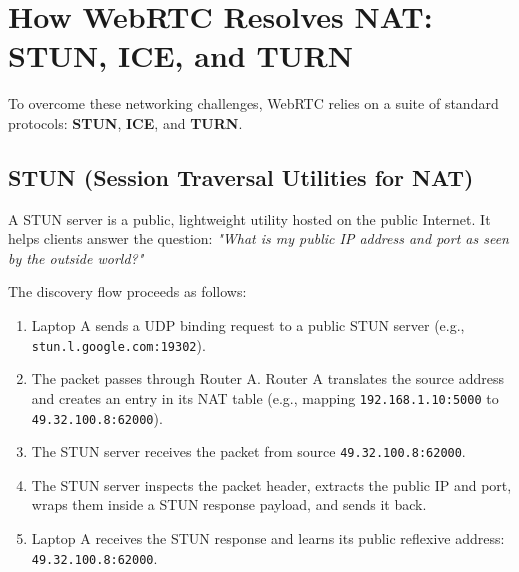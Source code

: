 \documentclass[11pt,a4paper]{article}
\begin{document}
\newpage

\section{How WebRTC Resolves NAT: STUN, ICE, and TURN}

To overcome these networking challenges, WebRTC relies on a suite of standard protocols: \textbf{STUN}, \textbf{ICE}, and \textbf{TURN}.

\subsection{STUN (Session Traversal Utilities for NAT)}
A STUN server is a public, lightweight utility hosted on the public Internet. It helps clients answer the question: \textit{"What is my public IP address and port as seen by the outside world?"}

The discovery flow proceeds as follows:
\begin{enumerate}
    \item Laptop A sends a UDP binding request to a public STUN server (e.g., \texttt{stun.l.google.com:19302}).
    \item The packet passes through Router A. Router A translates the source address and creates an entry in its NAT table (e.g., mapping \texttt{192.168.1.10:5000} to \texttt{49.32.100.8:62000}).
    \item The STUN server receives the packet from source \texttt{49.32.100.8:62000}.
    \item The STUN server inspects the packet header, extracts the public IP and port, wraps them inside a STUN response payload, and sends it back.
    \item Laptop A receives the STUN response and learns its public reflexive address: \texttt{49.32.100.8:62000}.
\end{enumerate}
\end{document}
